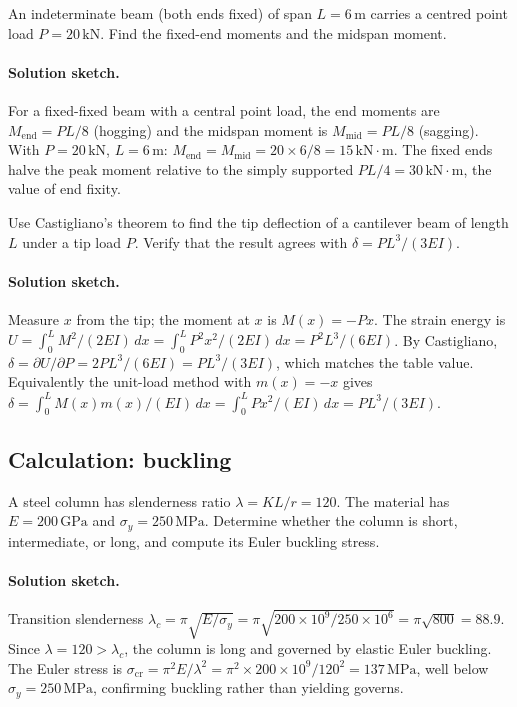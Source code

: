 \begin{exercise}
An indeterminate beam (both ends fixed) of span $L = 6\,\si{\meter}$
carries a centred point load $P = 20\,\text{kN}$. Find the
fixed-end moments and the midspan moment.

\paragraph{Solution sketch.} For a fixed-fixed beam with a central
point load, the end moments are $M_{\text{end}} = PL/8$ (hogging) and
the midspan moment is $M_{\text{mid}} = PL/8$ (sagging). With $P =
20\,\text{kN}$, $L = 6\,\si{\meter}$: $M_{\text{end}} = M_{\text{mid}} =
20\times 6/8 = 15\,\text{kN}\cdot\text{m}$. The fixed ends halve the
peak moment relative to the simply supported $PL/4 = 30\,\text{kN}\cdot
\text{m}$, the value of end fixity.
\end{exercise}

\begin{exercise}
Use Castigliano's theorem to find the tip deflection of a cantilever
beam of length $L$ under a tip load $P$. Verify that the result
agrees with $\delta = PL^3/(3EI)$.

\paragraph{Solution sketch.} Measure $x$ from the tip; the moment at
$x$ is $M(x) = -Px$. The strain energy is $U = \int_0^L M^2/(2EI)\,dx
= \int_0^L P^2x^2/(2EI)\,dx = P^2L^3/(6EI)$. By Castigliano,
$\delta = \partial U/\partial P = 2P L^3/(6EI) = PL^3/(3EI)$, which
matches the table value. Equivalently the unit-load method with
$m(x) = -x$ gives $\delta = \int_0^L M(x)m(x)/(EI)\,dx = \int_0^L
Px^2/(EI)\,dx = PL^3/(3EI)$.
\end{exercise}

\subsection*{Calculation: buckling}

\begin{exercise}
A steel column has slenderness ratio $\lambda = KL/r = 120$. The
material has $E = 200\,\text{GPa}$ and $\sigma_y = 250\,\text{MPa}$.
Determine whether the column is short, intermediate, or long, and
compute its Euler buckling stress.

\paragraph{Solution sketch.} Transition slenderness $\lambda_c = \pi
\sqrt{E/\sigma_y} = \pi\sqrt{200\times 10^9/250\times 10^6} = \pi
\sqrt{800} = 88.9$. Since $\lambda = 120 > \lambda_c$, the column is
long and governed by elastic Euler buckling. The Euler stress is
$\sigma_{\text{cr}} = \pi^2E/\lambda^2 = \pi^2\times 200\times 10^9/
120^2 = 137\,\text{MPa}$, well below $\sigma_y = 250\,\text{MPa}$,
confirming buckling rather than yielding governs.
\end{exercise}

